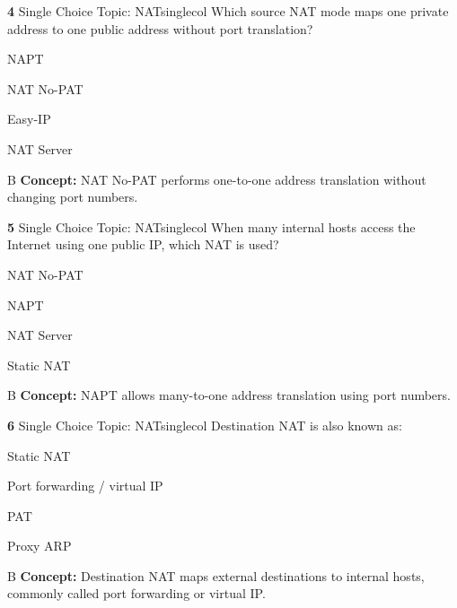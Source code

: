 \documentclass[10pt,a4paper]{article}
\begin{document}
\begin{qcard}{\color{white}\textbf{4} \hfill \small Single Choice \textbar{} Topic: NAT}{singlecol}
Which source NAT mode maps one private address to one public address without port translation?

\begin{qoptions}
\item NAPT
\item NAT No-PAT
\item Easy-IP
\item NAT Server
\end{qoptions}
\begin{explainbox}{B}
\textbf{Concept:} NAT No-PAT performs one-to-one address translation without changing port numbers.
\end{explainbox}
\end{qcard}

\begin{qcard}{\color{white}\textbf{5} \hfill \small Single Choice \textbar{} Topic: NAT}{singlecol}
When many internal hosts access the Internet using one public IP, which NAT is used?

\begin{qoptions}
\item NAT No-PAT
\item NAPT
\item NAT Server
\item Static NAT
\end{qoptions}
\begin{explainbox}{B}
\textbf{Concept:} NAPT allows many-to-one address translation using port numbers.
\end{explainbox}
\end{qcard}

\begin{qcard}{\color{white}\textbf{6} \hfill \small Single Choice \textbar{} Topic: NAT}{singlecol}
Destination NAT is also known as:

\begin{qoptions}
\item Static NAT
\item Port forwarding / virtual IP
\item PAT
\item Proxy ARP
\end{qoptions}
\begin{explainbox}{B}
\textbf{Concept:} Destination NAT maps external destinations to internal hosts, commonly called port forwarding or virtual IP.
\end{explainbox}
\end{qcard}
\end{document}
